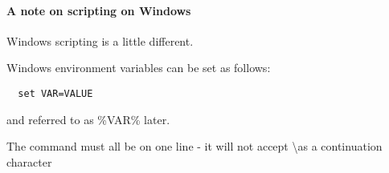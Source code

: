 \paragraph{A note on scripting on Windows}
Windows scripting is a little different.
\begin{description}
  \item Windows environment variables can be set as follows:
  \begin{verbatim}
  set VAR=VALUE
  \end{verbatim}
  and referred to as \%VAR\% later.
  \item The \map{} command must all be on one line - it will not accept \textbackslash as a continuation character
\end{description}





